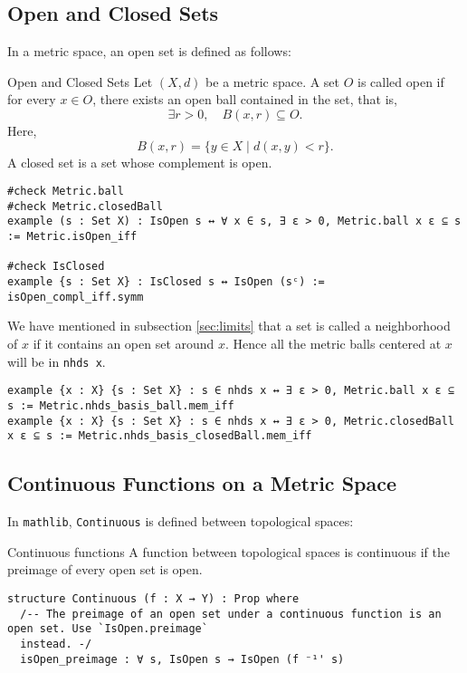 \documentclass[a4paper]{article}
\begin{document}
\subsection{Open and Closed Sets}

In a metric space, an open set is defined as follows:

\begin{dfn}{Open and Closed Sets}  
Let \((X, d)\) be a metric space. A set \(O\) is called open if for every \(x \in O\), there exists an open ball contained in the set, that is,  
\[
\exists r > 0, \quad B(x, r) \subseteq O.
\]  
Here,  
\[
B(x, r) = \{ y \in X \mid d(x, y) < r \}.
\]  
A closed set is a set whose complement is open.
\begin{lstlisting}[style = lean]
#check Metric.ball
#check Metric.closedBall
example (s : Set X) : IsOpen s ↔ ∀ x ∈ s, ∃ ε > 0, Metric.ball x ε ⊆ s := Metric.isOpen_iff

#check IsClosed
example {s : Set X} : IsClosed s ↔ IsOpen (sᶜ) := isOpen_compl_iff.symm
\end{lstlisting}
\end{dfn}

We have mentioned in subsection \ref{sec:limits} that a set is called a neighborhood of $x$ if it contains an open set around $x$. Hence all the metric balls centered at $x$ will be in \texttt{nhds x}.
\begin{xmp}{}
\begin{lstlisting}[style = lean]
example {x : X} {s : Set X} : s ∈ nhds x ↔ ∃ ε > 0, Metric.ball x ε ⊆ s := Metric.nhds_basis_ball.mem_iff
example {x : X} {s : Set X} : s ∈ nhds x ↔ ∃ ε > 0, Metric.closedBall x ε ⊆ s := Metric.nhds_basis_closedBall.mem_iff
\end{lstlisting}
\end{xmp}

\subsection{Continuous Functions on a Metric Space}
In \texttt{mathlib}, \texttt{Continuous} is defined between topological spaces:
\begin{dfn}{Continuous functions}
A function between topological spaces is continuous if the preimage of every open set is open.
\begin{lstlisting}[style = lean]
structure Continuous (f : X → Y) : Prop where
  /-- The preimage of an open set under a continuous function is an open set. Use `IsOpen.preimage`
  instead. -/
  isOpen_preimage : ∀ s, IsOpen s → IsOpen (f ⁻¹' s)
\end{lstlisting}
\end{dfn}
\end{document}
